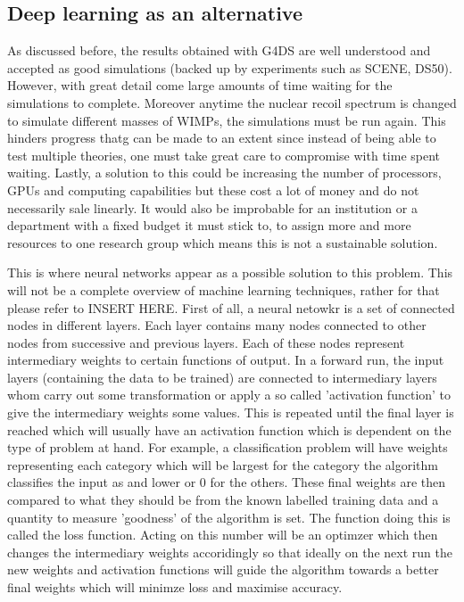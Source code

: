 \documentclass[11pt]{article} %
\begin{document}
\subsection{Deep learning as an alternative}
As discussed before, the results obtained with G4DS are well understood and accepted as good simulations (backed up by experiments such as SCENE, DS50).
However, with great detail come large amounts of time waiting for the simulations to complete.
Moreover anytime the nuclear recoil spectrum is changed to simulate different masses of WIMPs, the simulations must be run again.
This hinders progress thatg can be made to an extent since instead of being able to test multiple theories, one must take great care to compromise with time spent waiting.
Lastly, a solution to this could be increasing the number of processors, GPUs and computing capabilities but these cost a lot of money and do not necessarily sale linearly.
It would also be improbable for an institution or a department with a fixed budget it must stick to, to assign more and more resources to one research group which means this is
not a sustainable solution.
\\
\par This is where neural networks appear as a possible solution to this problem.
This will not be a complete overview of machine learning techniques, rather for that please refer to INSERT HERE.
First of all, a neural netowkr is a set of connected nodes in different layers.
Each layer contains many nodes connected to other nodes from successive and previous layers.
Each of these nodes represent intermediary weights to certain functions of output.
In a forward run, the input layers (containing the data to be trained) are connected to
intermediary layers whom carry out some transformation or apply a so called 'activation function' to give
the intermediary weights some values.
This is repeated until the final layer is reached which will usually have an activation function which is dependent on the type of problem at hand.
For example, a classification problem will have weights representing each category which will be largest for the category the algorithm classifies the input as and lower or 0 for the others.
These final weights are then compared to what they should be from the known labelled training data and a quantity to measure 'goodness' of the algorithm is set.
The function doing this is called the loss function.
Acting on this number will be an optimzer which then changes the intermediary weights accoridingly so that ideally on the next run
the new weights and activation functions will guide the algorithm towards a better final weights which will minimze loss and maximise accuracy.
\end{document}
